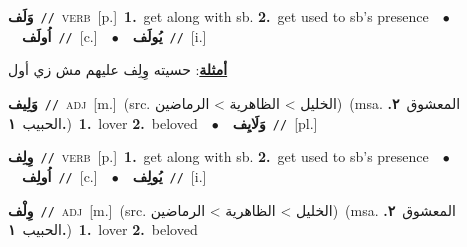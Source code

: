 \documentclass[10pt,a4paper,twoside]{article} %
\begin{document}
\begin{multicols}{2}
{\setlength\topsep{0pt}\textbf{\foreignlanguage{arabic}{وَلَف}}\ {\color{gray}\texttt{//}\color{black}}\ \textsc{verb}\ [p.]\ \textbf{1.}~get along with sb.  \textbf{2.}~get used to sb's presence\ \ $\bullet$\ \ \setlength\topsep{0pt}\textbf{\foreignlanguage{arabic}{اُولَف}}\ {\color{gray}\texttt{//}\color{black}}\ [c.]\ \ $\bullet$\ \ \setlength\topsep{0pt}\textbf{\foreignlanguage{arabic}{يُولَف}}\ {\color{gray}\texttt{//}\color{black}}\ [i.]\  \begin{flushright}\color{gray}\foreignlanguage{arabic}{\textbf{\underline{\foreignlanguage{arabic}{أمثلة}}}: حسيته وِلِف عليهم مش زي أول}\end{flushright}\color{black}} \vspace{2mm}

{\setlength\topsep{0pt}\textbf{\foreignlanguage{arabic}{وَلِيف}}\ {\color{gray}\texttt{//}\color{black}}\ \textsc{adj}\ [m.]\ (src. \color{gray}\foreignlanguage{arabic}{الخليل > الظاهرية > الرماضين}\color{black})\ \color{gray}(msa. \foreignlanguage{arabic}{المعشوق}~\foreignlanguage{arabic}{\textbf{٢.}}  \foreignlanguage{arabic}{الحبيب}~\foreignlanguage{arabic}{\textbf{١.}})\color{black}\ \textbf{1.}~lover  \textbf{2.}~beloved\ \ $\bullet$\ \ \setlength\topsep{0pt}\textbf{\foreignlanguage{arabic}{وَلَايِف}}\ {\color{gray}\texttt{//}\color{black}}\ [pl.]\ } \vspace{2mm}

{\setlength\topsep{0pt}\textbf{\foreignlanguage{arabic}{وِلِف}}\ {\color{gray}\texttt{//}\color{black}}\ \textsc{verb}\ [p.]\ \textbf{1.}~get along with sb.  \textbf{2.}~get used to sb's presence\ \ $\bullet$\ \ \setlength\topsep{0pt}\textbf{\foreignlanguage{arabic}{اُولِف}}\ {\color{gray}\texttt{//}\color{black}}\ [c.]\ \ $\bullet$\ \ \setlength\topsep{0pt}\textbf{\foreignlanguage{arabic}{يُولِف}}\ {\color{gray}\texttt{//}\color{black}}\ [i.]\ } \vspace{2mm}

{\setlength\topsep{0pt}\textbf{\foreignlanguage{arabic}{وِلْف}}\ {\color{gray}\texttt{//}\color{black}}\ \textsc{adj}\ [m.]\ (src. \color{gray}\foreignlanguage{arabic}{الخليل > الظاهرية > الرماضين}\color{black})\ \color{gray}(msa. \foreignlanguage{arabic}{المعشوق}~\foreignlanguage{arabic}{\textbf{٢.}}  \foreignlanguage{arabic}{الحبيب}~\foreignlanguage{arabic}{\textbf{١.}})\color{black}\ \textbf{1.}~lover  \textbf{2.}~beloved\ } \vspace{2mm}


\end{multicols}
\end{document}
